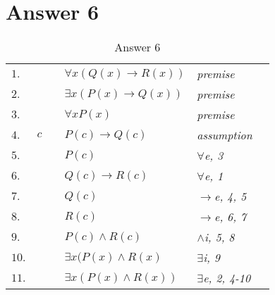 \documentclass[12pt]{article}
\begin{document}
\section*{Answer 6}

\vspace{10px}

\begin{table}[H]
	\centering
	\caption{Answer 6}
	\vspace{5px}
	\begin{tabular}{*6{l}}
		$1.$ & & & $\forall x ( Q(x) \rightarrow R(x))$ & \textit{premise} & \\
		
		$2.$ & & & $\exists x(P(x) \rightarrow Q(x))$ & \textit{premise} & \\
		
		$3.$ & & & $\forall x P(x)$ & \textit{premise} & \\
		\cline{2-6}
		
		$4.$ &\multicolumn{1}{|c}{$c$} & & $P(c) \rightarrow Q(c)$ &\textit{assumption} &\multicolumn{1}{c|}{}\\
		
		$5.$ &\multicolumn{1}{|c}{} & & $P(c)$ &\textit{$\forall$e, 3} &\multicolumn{1}{c|}{}\\
		
		$6.$ &\multicolumn{1}{|c}{} & & $Q(c) \rightarrow R(c)$ &\textit{$\forall$e, 1} &\multicolumn{1}{c|}{}\\
		
		$7.$ &\multicolumn{1}{|c}{} & & $Q(c)$ &\textit{$\rightarrow$e, 4, 5} &\multicolumn{1}{c|}{}\\
		
		$8.$ &\multicolumn{1}{|c}{} & & $R(c)$ &\textit{$\rightarrow$e, 6, 7} &\multicolumn{1}{c|}{}\\
		
		$9.$ &\multicolumn{1}{|c}{} & & $P(c) \land R(c)$ &\textit{$\land$i, 5, 8} &\multicolumn{1}{c|}{}\\
		
		$10.$ &\multicolumn{1}{|c}{} & & $\exists x (P(x) \land R(x)$ &\textit{$\exists$i, 9} &\multicolumn{1}{c|}{}\\ \cline{2-6}
		
		$11.$ & & & $\exists x (P(x) \land R(x))$ & \textit{$\exists$e, 2, 4-10} & \\
		
	\end{tabular}
\end{table}
\end{document}
